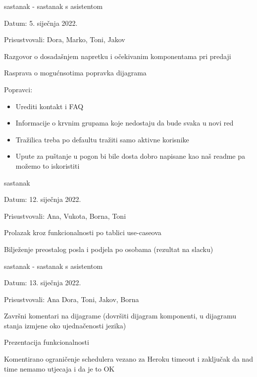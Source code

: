 \begin{packed_enum}
	        \bigskip
	        \item sastanak - sastanak s asistentom
	        \item[] \begin{packed_item}
	           \item Datum: 5. siječnja 2022.
	           \item Prisustvovali: Dora, Marko, Toni, Jakov
	           \item Razgovor o dosadašnjem napretku i očekivanim komponentama pri predaji
	            \item Rasprava o mogućnsotima popravka dijagrama
            	\item Popravci:
            	\begin{itemize}
            	    \item Urediti kontakt i FAQ
            	    \item Informacije o krvnim grupama koje nedostaju da bude svaka u novi red
            	    \item Tražilica treba po defaultu tražiti samo aktivne korisnike
            	    \item Upute za puštanje u pogon bi bile dosta dobro napisane kao naš readme pa možemo to iskoristiti
            	\end{itemize}
	        \end{packed_item}
	        
	        \bigskip
	        \item sastanak
	        \item[] \begin{packed_item}
	           \item Datum: 12. siječnja 2022.
	           \item Prisustvovali: Ana, Vukota, Borna, Toni
	           \item Prolazak kroz funkcionalnosti po tablici use-caseova
	            \item Bilježenje preostalog posla i podjela po osobama (rezultat na slacku)
	        \end{packed_item}
	        
	        \bigskip
	        \item sastanak - sastanak s asistentom
	        \item[] \begin{packed_item}
	           \item Datum: 13. siječnja 2022.
	           \item Prisustvovali: Ana Dora, Toni, Jakov, Borna
	           \item Završni komentari na dijagrame (dovršiti dijagram komponenti, u dijagramu stanja izmjene oko ujednačenosti jezika)
	            \item Prezentacija funkcionalnosti
	            \item Komentirano ograničenje schedulera vezano za Heroku timeout i zaključak da nad time nemamo utjecaja i da je to OK
	        \end{packed_item}
	
		
		\end{packed_enum}
		
